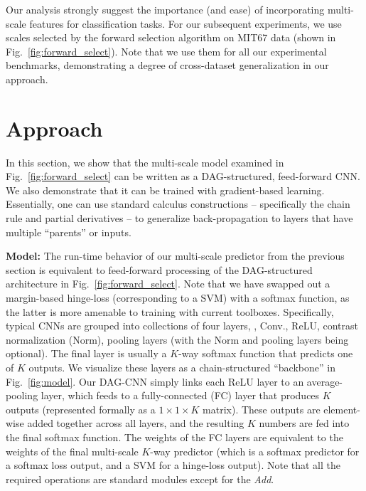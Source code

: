 \documentclass[10pt,twocolumn,letterpaper]{article}
\begin{document}
Our analysis strongly suggest the importance (and ease) of incorporating multi-scale features for classification tasks. For our subsequent experiments, we use scales selected by the forward selection algorithm on MIT67 data (shown in Fig.~\ref{fig:forward_select}). Note that we use them for all our experimental benchmarks, demonstrating a degree of cross-dataset generalization in our approach.

\section{Approach\label{sec:approach}} 

In this section, we show that the multi-scale model examined in Fig.~\ref{fig:forward_select} can be written as a DAG-structured, feed-forward CNN. We also demonstrate that it can be trained with gradient-based learning. Essentially, one can use standard calculus constructions -- specifically the chain rule and partial derivatives -- to generalize back-propagation to layers that have multiple ``parents'' or inputs.

{\bf Model:} The run-time behavior of our multi-scale predictor from the previous section is equivalent to feed-forward processing of the DAG-structured architecture in Fig.~\ref{fig:forward_select}. Note that we have swapped out a margin-based hinge-loss (corresponding to a SVM) with a softmax function, as the latter is more amenable to training with current toolboxes. Specifically, typical CNNs are grouped into collections of four layers, \ie, Conv., ReLU, contrast normalization (Norm), pooling layers (with the Norm and pooling layers being optional). The final layer is usually a $K$-way softmax function that predicts one of $K$ outputs. We visualize these layers as a chain-structured ``backbone'' in Fig.~\ref{fig:model}. Our DAG-CNN simply links each ReLU layer to an average-pooling layer, which feeds to a fully-connected (FC) layer that produces $K$ outputs (represented formally as a $1 \times 1 \times K$ matrix). These outputs are element-wise added together across all layers, and the resulting $K$ numbers are fed into the final softmax function. The weights of the FC layers are equivalent to the weights of the final multi-scale $K$-way predictor (which is a softmax predictor for a softmax loss output, and a SVM for a hinge-loss output). Note that all the required operations are standard modules except for the \textit{Add}.

\end{document}
